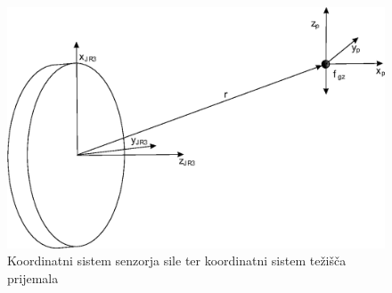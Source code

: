 \begin{figure}
	\centering
	\includegraphics[scale=0.5]{./Slike/jr3_coordinatesistem.eps}
	\caption{Koordinatni sistem senzorja sile ter koordinatni sistem težišča prijemala}
	\label{fig:jr3_coordinatesistem}
\end{figure}
